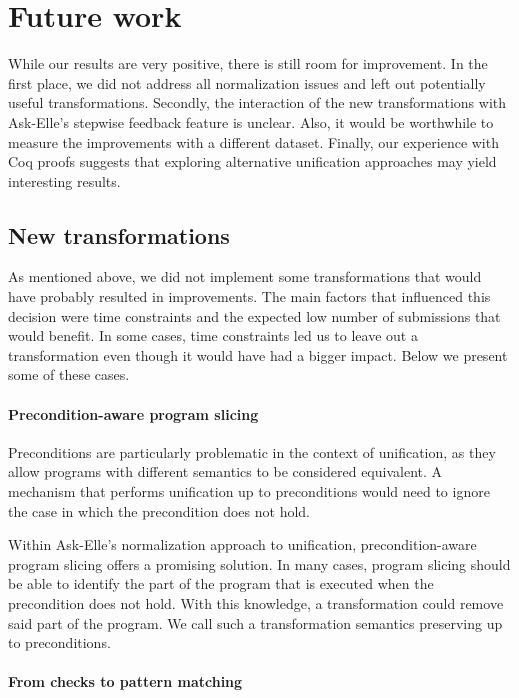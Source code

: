 \section{Future work}
\label{sec:conclusion-future}

While our results are very positive, there is still room for improvement. In the first place, we did not address all normalization issues and left out potentially useful transformations. Secondly, the interaction of the new transformations with Ask-Elle's stepwise feedback feature is unclear. Also, it would be worthwhile to measure the improvements with a different dataset. Finally, our experience with Coq proofs suggests that exploring alternative unification approaches may yield interesting results.

\subsection{New transformations}

As mentioned above, we did not implement some transformations that would have probably resulted in improvements. The main factors that influenced this decision were time constraints and the expected low number of submissions that would benefit. In some cases, time constraints led us to leave out a transformation even though it would have had a bigger impact. Below we present some of these cases.

\paragraph{Precondition-aware program slicing}

Preconditions are particularly problematic in the context of unification, as they allow programs with different semantics to be considered equivalent. A mechanism that performs unification up to preconditions would need to ignore the case in which the precondition does not hold.

Within Ask-Elle's normalization approach to unification, precondition-aware program slicing offers a promising solution. In many cases, program slicing should be able to identify the part of the program that is executed when the precondition does not hold. With this knowledge, a transformation could remove said part of the program. We call such a transformation semantics preserving up to preconditions.

\paragraph{From checks to pattern matching}

